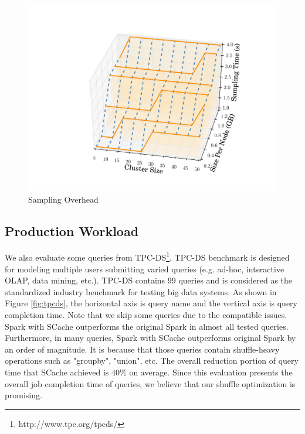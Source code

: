 \begin{figure}
	\centering
	\includegraphics[width=0.6\linewidth]{fig/sampling}
	\caption{Sampling Overhead}
	\label{fig:sampling}
	\vspace{-1em}
\end{figure}

\subsection{Production Workload}
We also evaluate some queries from TPC-DS\footnote{http://www.tpc.org/tpcds/}. 
TPC-DS benchmark is designed for modeling multiple users submitting varied queries (e.g. ad-hoc, interactive OLAP, data mining, etc.). 
TPC-DS contains 99 queries and is considered as the standardized industry benchmark for testing big data systems. 
As shown in Figure \ref{fig:tpcds}, the horizontal axis is query name and the vertical axis is query completion time. 
Note that we skip some queries due to the compatible issues. 
Spark with SCache outperforms the original Spark in almost all tested queries. 
Furthermore, in many queries, Spark with SCache outperforms original Spark by an order of magnitude. 
It is because that those queries contain shuffle-heavy operations such as "groupby", "union", etc.
The overall reduction portion of query time that SCache achieved is $40\%$ on average. 
Since this evaluation presents the overall job completion time of queries, we believe that our shuffle optimization is promising.
